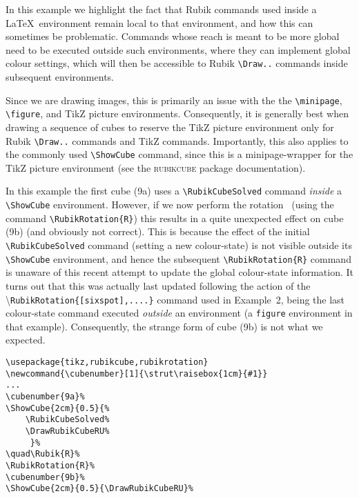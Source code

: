 \documentclass[a4paper]{article}
\newcommand{\cubenumber}[1]{\strut\raisebox{1cm}{#1}}
\begin{document}
In this example we highlight the fact that Rubik commands used inside a \LaTeX\ 
environment remain local to that environment, and how this can sometimes  be 
problematic.  Commands whose reach is meant to be  more global need to be 
executed outside such environments, where they can implement  global colour 
settings, which will then be accessible to Rubik \verb!\Draw..! commands inside 
subsequent environments.

Since we are drawing images, this is primarily an issue 
with the   the \verb!\minipage!, \verb!\figure!, and TikZ picture environments.
Consequently, it is generally best when drawing a sequence of  cubes  to reserve 
the TikZ picture environment  only  for Rubik \verb!\Draw..! commands and TikZ 
commands. Importantly, this  also applies to the commonly used  \verb!\ShowCube! 
command, since this is a minipage-wrapper for the TikZ  picture environment 
(see the \textsc{rubikcube} package documentation).

In this example the first cube (9a) uses a \verb!\RubikCubeSolved! command 
\textit{inside} a \verb!\ShowCube! environment. However, if we now perform the 
rotation  \textRubik{R}\ (using the command \verb!\RubikRotation{R}!) this results 
in  a quite unexpected effect on cube (9b) (and obviously not correct). This is because 
 the effect of the initial \verb!\RubikCubeSolved! command 
 (setting a new colour-state) is not  visible outside its \verb!\ShowCube! 
 environment, and hence the subsequent \verb!\RubikRotation{R}! command is unaware 
 of this recent attempt to update  the global colour-state information. 
 It turns out that this was actually last updated following the action of the \textbackslash\texttt{RubikRotation\{[sixspot],....\}} command used in 
Example~2, being the last colour-state command executed \textit{outside} an 
environment (a \texttt{figure}  environment in that example). Consequently, 
the strange form of cube (9b) is not what we expected.


\medskip
\noindent%
\cubenumber{9a}%
%
\quad{}%
%
\cubenumber{9b}%
%
\hspace{5mm}
\begin{minipage}{0.5\textwidth}
\begin{verbatim}
\usepackage{tikz,rubikcube,rubikrotation}
\newcommand{\cubenumber}[1]{\strut\raisebox{1cm}{#1}}
...
\cubenumber{9a}%
\ShowCube{2cm}{0.5}{%
    \RubikCubeSolved%
    \DrawRubikCubeRU%
     }%
\quad\Rubik{R}%
\RubikRotation{R}%
\cubenumber{9b}%
\ShowCube{2cm}{0.5}{\DrawRubikCubeRU}%
\end{verbatim}
\end{minipage}
\end{document}
